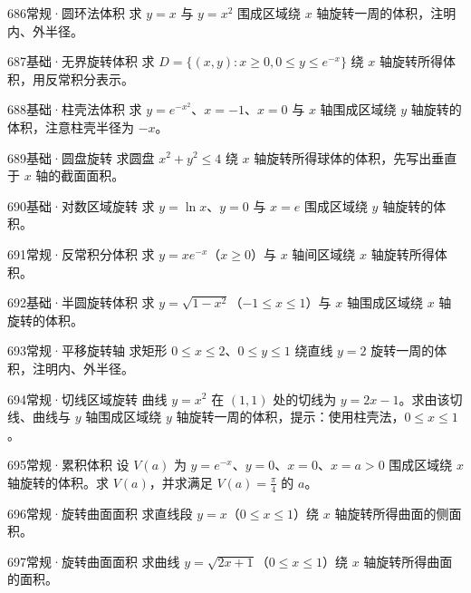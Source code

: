 \begin{exercise}{686}{常规·圆环法体积}
求 $y=x$ 与 $y=x^2$ 围成区域绕 $x$ 轴旋转一周的体积，注明内、外半径。
\end{exercise}
\begin{exercise}{687}{基础·无界旋转体积}
求 $D=\{(x,y):x\ge0,0\le y\le e^{-x}\}$ 绕 $x$ 轴旋转所得体积，用反常积分表示。
\end{exercise}
\begin{exercise}{688}{基础·柱壳法体积}
求 $y=e^{-x^2}$、$x=-1$、$x=0$ 与 $x$ 轴围成区域绕 $y$ 轴旋转的体积，注意柱壳半径为 $-x$。
\end{exercise}
\begin{exercise}{689}{基础·圆盘旋转}
求圆盘 $x^2+y^2\le4$ 绕 $x$ 轴旋转所得球体的体积，先写出垂直于 $x$ 轴的截面面积。
\end{exercise}
\begin{exercise}{690}{基础·对数区域旋转}
求 $y=\ln x$、$y=0$ 与 $x=e$ 围成区域绕 $y$ 轴旋转的体积。
\end{exercise}
\begin{exercise}{691}{常规·反常积分体积}
求 $y=xe^{-x}$（$x\ge0$）与 $x$ 轴间区域绕 $x$ 轴旋转所得体积。
\end{exercise}
\begin{exercise}{692}{基础·半圆旋转体积}
求 $y=\sqrt{1-x^2}$（$-1\le x\le1$）与 $x$ 轴围成区域绕 $x$ 轴旋转的体积。
\end{exercise}
\begin{exercise}{693}{常规·平移旋转轴}
求矩形 $0\le x\le2$、$0\le y\le1$ 绕直线 $y=2$ 旋转一周的体积，注明内、外半径。
\end{exercise}
\begin{exercise}{694}{常规·切线区域旋转}
曲线 $y=x^2$ 在 $(1,1)$ 处的切线为 $y=2x-1$。求由该切线、曲线与 $y$ 轴围成区域绕 $y$ 轴旋转一周的体积，提示：使用柱壳法，$0\le x\le1$。
\end{exercise}
\begin{exercise}{695}{常规·累积体积}
设 $V(a)$ 为 $y=e^{-x}$、$y=0$、$x=0$、$x=a>0$ 围成区域绕 $x$ 轴旋转的体积。求 $V(a)$，并求满足 $V(a)=\frac{\pi}{4}$ 的 $a$。
\end{exercise}
\begin{exercise}{696}{常规·旋转曲面面积}
求直线段 $y=x$（$0\le x\le1$）绕 $x$ 轴旋转所得曲面的侧面积。
\end{exercise}
\begin{exercise}{697}{常规·旋转曲面面积}
求曲线 $y=\sqrt{2x+1}$（$0\le x\le1$）绕 $x$ 轴旋转所得曲面的面积。
\end{exercise}

